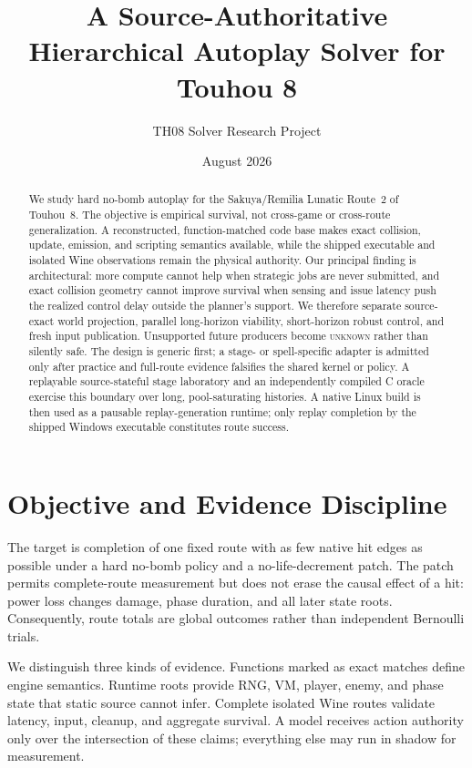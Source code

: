 \documentclass[10pt]{article}
\title{A Source-Authoritative Hierarchical Autoplay Solver for Touhou 8}
\author{TH08 Solver Research Project}
\date{August 2026}
\newcommand{\unknown}{\textsc{unknown}}
\begin{document}
\maketitle

\begin{abstract}
We study hard no-bomb autoplay for the Sakuya/Remilia Lunatic Route~2 of
Touhou~8.  The objective is empirical survival, not cross-game or cross-route
generalization.  A reconstructed, function-matched code base makes exact
collision, update, emission, and scripting semantics available, while the
shipped executable and isolated Wine observations remain the physical
authority.  Our principal finding is architectural: more compute cannot help
when strategic jobs are never submitted, and exact collision geometry cannot
improve survival when sensing and issue latency push the realized control
delay outside the planner's support.  We therefore separate source-exact
world projection, parallel long-horizon viability, short-horizon robust
control, and fresh input publication.  Unsupported future producers become
\unknown{} rather than silently safe.  The design is generic first; a
stage- or spell-specific adapter is admitted only after practice and full-route
evidence falsifies the shared kernel or policy.  A replayable source-stateful
stage laboratory and an independently compiled C oracle exercise this
boundary over long, pool-saturating histories.  A native Linux build is then
used as a pausable replay-generation runtime; only replay completion by the
shipped Windows executable constitutes route success.
\end{abstract}

\section{Objective and Evidence Discipline}

The target is completion of one fixed route with as few native hit edges as
possible under a hard no-bomb policy and a no-life-decrement patch.  The patch
permits complete-route measurement but does not erase the causal effect of a
hit: power loss changes damage, phase duration, and all later state roots.
Consequently, route totals are global outcomes rather than independent Bernoulli
trials.

We distinguish three kinds of evidence.  Functions marked as exact matches
define engine semantics.  Runtime roots provide RNG, VM, player, enemy, and
phase state that static source cannot infer.  Complete isolated Wine routes
validate latency, input, cleanup, and aggregate survival.  A model receives
action authority only over the intersection of these claims; everything else
may run in shadow for measurement.
\end{document}
